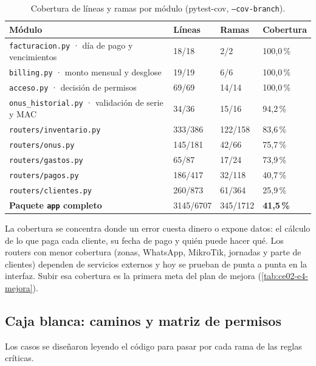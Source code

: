 \begin{table}[H]
\centering
\caption{Cobertura de líneas y ramas por módulo (pytest-cov, \texttt{--cov-branch}).}
\label{tab:ce02-e4-cobertura}
\small
\begin{tabularx}{\textwidth}{XC{2cm}C{2cm}C{2cm}}
\toprule
\textbf{Módulo} & \textbf{Líneas} & \textbf{Ramas} & \textbf{Cobertura} \\
\midrule
\texttt{facturacion.py} · día de pago y vencimientos & 18/18 & 2/2 & 100,0\,\% \\
\texttt{billing.py} · monto mensual y desglose & 19/19 & 6/6 & 100,0\,\% \\
\texttt{acceso.py} · decisión de permisos & 69/69 & 14/14 & 100,0\,\% \\
\texttt{onus\_historial.py} · validación de serie y MAC & 34/36 & 15/16 & 94,2\,\% \\
\texttt{routers/inventario.py} & 333/386 & 122/158 & 83,6\,\% \\
\texttt{routers/onus.py} & 145/181 & 42/66 & 75,7\,\% \\
\texttt{routers/gastos.py} & 65/87 & 17/24 & 73,9\,\% \\
\texttt{routers/pagos.py} & 186/417 & 32/118 & 40,7\,\% \\
\texttt{routers/clientes.py} & 260/873 & 61/364 & 25,9\,\% \\
\midrule
\textbf{Paquete \texttt{app} completo} & 3145/6707 & 345/1712 & \textbf{41,5\,\%} \\
\bottomrule
\end{tabularx}
\end{table}

La cobertura se concentra donde un error cuesta dinero o expone datos: el cálculo de lo que
paga cada cliente, su fecha de pago y quién puede hacer qué. Los routers con menor cobertura
(zonas, WhatsApp, MikroTik, jornadas y parte de clientes) dependen de servicios externos y hoy
se prueban de punta a punta en la interfaz. Subir esa cobertura es la primera meta del plan
de mejora (\cref{tab:ce02-e4-mejora}).

\subsection{Caja blanca: caminos y matriz de permisos}

Los casos se diseñaron leyendo el código para pasar por cada rama de las reglas críticas.

